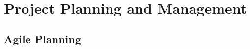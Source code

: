 \chapter{Project Planning and Management}
\label{planning}

\ifpdf
    \graphicspath{{Chapter6/Figs/Raster/}{Chapter6/Figs/PDF/}{Chapter6/Figs/}}
\else
    \graphicspath{{Chapter6/Figs/Vector/}{Chapter6/Figs/}}
\fi

\section{Agile Planning}
\label{planning:agile}